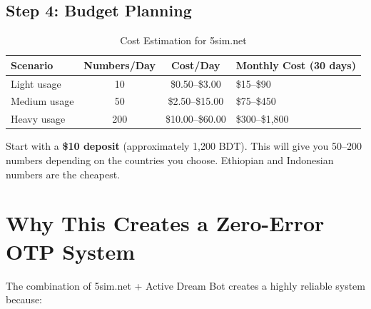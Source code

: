 \subsection{Step 4: Budget Planning}

\begin{table}[H]
\centering
\caption{Cost Estimation for 5sim.net}
\begin{tabularx}{\textwidth}{|l|c|c|X|}
\hline
\textbf{Scenario} & \textbf{Numbers/Day} & \textbf{Cost/Day} & \textbf{Monthly Cost (30 days)} \\
\hline
Light usage & 10 & \$0.50--\$3.00 & \$15--\$90 \\
\hline
Medium usage & 50 & \$2.50--\$15.00 & \$75--\$450 \\
\hline
Heavy usage & 200 & \$10.00--\$60.00 & \$300--\$1,800 \\
\hline
\end{tabularx}
\end{table}

\begin{tipbox}
Start with a \textbf{\$10 deposit} (approximately 1,200 BDT). This will give you 50--200 numbers depending on the countries you choose. Ethiopian and Indonesian numbers are the cheapest.
\end{tipbox}

\section{Why This Creates a Zero-Error OTP System}

The combination of 5sim.net + Active Dream Bot creates a highly reliable system because:

